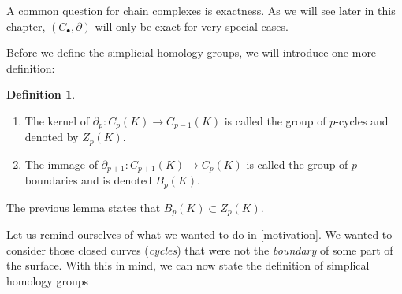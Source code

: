 \documentclass[toc=bib]{scrartcl}
\theoremstyle{plain}
\theoremstyle{definition}
\newtheorem	{definition}[theorem]{Definition}
\theoremstyle{remark}
\begin{document}
A common question for chain complexes is exactness. As we will see later in this chapter, $(C_\bullet,\partial)$ will only be exact for very special cases. 

Before we define the simplicial homology groups, we will introduce one more definition:

\begin{definition}\mbox{}
	\begin{enumerate}
		\item The kernel of $\partial_p: C_p(K)\to C_{p-1}(K)$ is called the group of $p$-cycles and denoted by $Z_p(K)$.
		\item The immage of $\partial_{p+1}: C_{p+1}(K)\to C_{p}(K)$ is called the group of $p$-boundaries and is denoted $B_p(K)$.
	\end{enumerate}
	
\end{definition}
The previous lemma states that $B_p(K)\subset Z_p(K)$.

Let us remind ourselves of what we wanted to do in \autoref{motivation}. We wanted to consider those closed curves (\emph{cycles}) that were not the \emph{boundary} of some part of the surface. With this in mind, we can now state the definition of simplical homology groups
\end{document}
